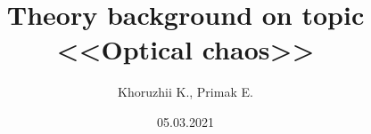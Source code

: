 \documentclass[]{beamer}
\title[Optical chaos]{Theory background on topic \\ <<Optical chaos>>}
\author{
Khoruzhii K., 
Primak E.}
\institute[MIPT]
\begin{document}
\date{05.03.2021}
\maketitle

% 

% 
% 
% 






\end{document}
